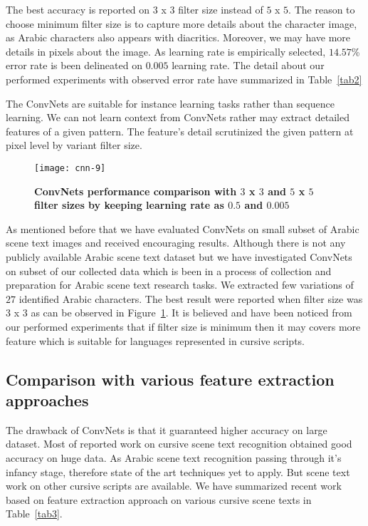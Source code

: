 \documentclass[conference]{IEEEtran}
\begin{document}
The best accuracy is reported on $3$ x $3$ filter size instead of $5$ x $5$.
The reason to choose minimum filter size is to capture more details about the character image, as Arabic characters also appears with diacritics.
Moreover, we may have more details in pixels about the image.
As learning rate is empirically selected, $14.57$\% error rate is been delineated on $0.005$ learning rate.
The detail about our performed experiments with observed error rate have summarized in Table~\ref{tab2}

The ConvNets are suitable for instance learning tasks rather than sequence learning. We can not learn context from ConvNets rather may extract detailed features of a given pattern.
The feature's detail scrutinized the given pattern at pixel level by variant filter size. 

\begin{figure}[H]
\centering
\texttt{[image: cnn-9]}
\caption{\bf ConvNets performance comparison with $3$ x $3$ and $5$ x $5$ filter sizes by keeping learning rate as $0.5$ and $0.005$}
\label{graph}
\end{figure}

As mentioned before that we have evaluated ConvNets on small subset of Arabic scene text images and received encouraging results.
Although there is not any publicly available Arabic scene text dataset but we have investigated ConvNets on subset of our collected data which is been in a process of collection and preparation for Arabic scene text research tasks.
We extracted few variations of $27$ identified Arabic characters.
The best result were reported when filter size was $3$ x $3$ as can be observed in Figure~\ref{graph}.
It is believed and have been noticed from our performed experiments that if filter size is minimum then it may covers more feature which is suitable for languages represented in cursive scripts.


\subsection{Comparison with various feature extraction approaches}
The drawback of ConvNets is that it guaranteed higher accuracy on large dataset.
Most of reported work on cursive scene text recognition obtained good accuracy on huge data. 
As Arabic scene text recognition passing through it's infancy stage, therefore state of the art techniques yet to apply. 
But scene text work on other cursive scripts are available.
We have summarized recent work based on feature extraction approach on various cursive scene texts in Table~\ref{tab3}.
\end{document}
